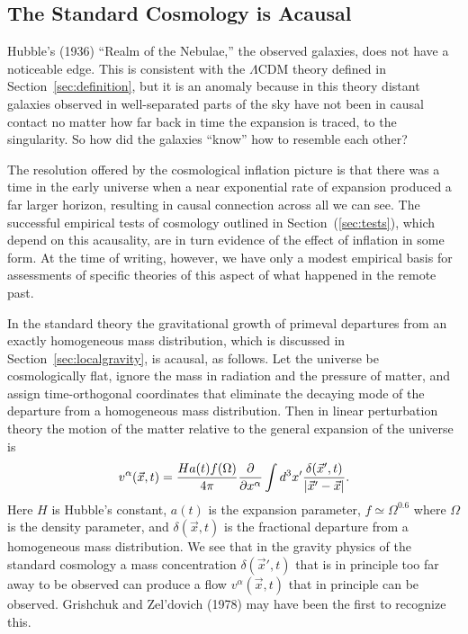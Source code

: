 \documentclass[fleqn,12pt]{article}
\newcommand{\beq}{\begin{equation}}
\newcommand{\eeq}{\end{equation}}
\begin{document}
\subsection{The  Standard Cosmology is Acausal}\label{sec:theacausaluiverse}

Hubble's (1936) ``Realm of the Nebulae,'' the observed galaxies, does not have a noticeable edge. This is consistent with the $\Lambda$CDM theory defined in Section~\ref{sec:definition}, but it is an anomaly because in this theory distant galaxies observed in well-separated parts of the sky have not been in causal contact no matter how far back in time the expansion is traced, to the singularity. So how did the galaxies ``know'' how to resemble each other? 

The resolution offered by the cosmological inflation picture is that there was a time in the early universe when a near exponential rate of expansion produced a far larger horizon, resulting in causal connection across all we can see. The successful empirical tests of cosmology outlined in Section~(\ref{sec:tests}), which depend on this acausality, are in turn evidence of the effect of inflation in some form. At the time of writing, however, we have only a modest empirical basis for assessments of specific theories of this aspect of what happened in the remote past. 

In the standard theory the gravitational growth of primeval departures from an exactly homogeneous mass distribution, which is discussed in Section~\ref{sec:localgravity}, is acausal, as follows. Let the universe be cosmologically flat, ignore the mass in radiation and the pressure of matter, and assign time-orthogonal coordinates that eliminate the decaying mode of the departure from a homogeneous mass distribution. Then in linear perturbation theory the motion of the matter relative to the general expansion of the universe is
\beq
v^\alpha(\vec x,t) = {Ha(t)f(\Omega)\over 4\pi}
{\partial\over\partial x^\alpha} \int d^3x'{\delta(\vec x',t)\over |\vec x' - \vec x|}. 
\label{eq:peculiaracceleration}
\eeq
Here $H$ is Hubble's constant, $a(t)$ is the expansion parameter, $f\simeq \Omega^{0.6}$ where $\Omega$ is the density parameter, and $\delta(\vec x,t)$ is the fractional departure from a homogeneous mass distribution. We see that in the gravity physics of the standard cosmology a mass concentration $\delta(\vec x',t)$ that is in principle too far away to be observed can produce a flow $v^\alpha(\vec x,t)$ that in principle can be observed. Grishchuk and Zel'dovich (1978) may have been the first to recognize this. 
\end{document}
